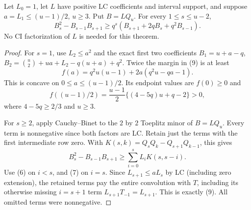 \begin{theorem}
Let $L_0=1$, let $L$ have positive LC coefficients and interval
support, and suppose $a=L_1\le(u-1)/2$, $u\ge3$.
Put $B=LQ_u$. For every $1\le s\le u-2$,
\[
 B_s^2-B_{s-1}B_{s+1}\ge
 q^s(B_{s+1}+2qB_s+q^2B_{s-1}).                    \tag{9}
\]
No CI factorization of $L$ is needed for this theorem.
\end{theorem}
\begin{proof}
For $s=1$, use $L_2\le a^2$ and the exact first two coefficients
$B_1=u+a-q$,
$B_2={u\choose2}+ua+L_2-q(u+a)+q^2$.
Twice the margin in (9) is at least
\[
 f(a)=q^2u(u-1)+2a(q^2u-qa-1).
\]
This is concave on $0\le a\le(u-1)/2$. Its endpoint values are
$f(0)\ge0$ and
\[
 f((u-1)/2)=\frac{u-1}{2}\{(4-5q)u+q-2\}>0,
\]
where $4-5q\ge2/3$ and $u\ge3$.

For $s\ge2$, apply Cauchy--Binet to the $2$ by $2$
Toeplitz minor of $B=LQ_u$. Every term is nonnegative since both
factors are LC. Retain just the terms with the first intermediate
row zero. With $K(s,k)=Q_sQ_k-Q_{s+1}Q_{k-1}$, this gives
\[
 B_s^2-B_{s-1}B_{s+1}\ge\sum_{i=0}^s L_iK(s,s-i).
\]
Use (6) on $i<s$, and (7) on $i=s$.
Since $L_{s+1}\le aL_s$ by LC (including zero extension), the
retained terms pay the entire convolution with $T$, including its
otherwise missing $i=s+1$ term $L_{s+1}T_{-1}=L_{s+1}$.
This is exactly (9). All omitted terms were nonnegative.
\end{proof}

